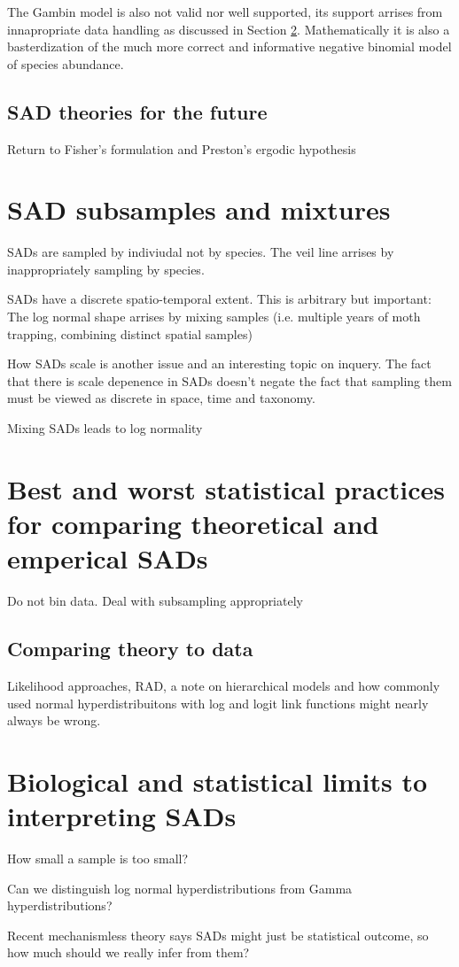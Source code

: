 \documentclass[12pt]{article}
\begin{document}
The Gambin model is also not valid nor well supported, its support
arrises from innapropriate data handling as discussed in Section
\ref{sec:statPrac}. Mathematically it is also a basterdization of the
much more correct and informative negative binomial model of species
abundance.

\subsection{SAD theories for the future}
Return to Fisher's formulation and Preston's ergodic hypothesis


\section{SAD subsamples and mixtures}
\label{sec:samp}

SADs are sampled by indiviudal not by species. The veil line arrises
by inappropriately sampling by species.

SADs have a discrete spatio-temporal extent. This is arbitrary but
important: The log normal shape arrises by mixing samples
(i.e. multiple years of moth trapping, combining distinct spatial
samples)

How SADs scale is another issue and an interesting topic on inquery.
The fact that there is scale depenence in SADs doesn't negate the fact
that sampling them must be viewed as discrete in space, time and
taxonomy.

Mixing SADs leads to log normality

\section{Best and worst statistical practices for comparing
  theoretical and emperical SADs}
\label{sec:statPrac}

Do not bin data. Deal with subsampling appropriately

\subsection{Comparing theory to data}
Likelihood approaches, RAD, a note on hierarchical models and how
commonly used normal hyperdistribuitons with log and logit link
functions might nearly always be wrong.

\section{Biological and statistical limits to interpreting SADs}

How small a sample is too small?

Can we distinguish log normal hyperdistributions from Gamma
hyperdistributions?

Recent mechanismless theory says SADs might just be statistical
outcome, so how much should we really infer from them?
\end{document}
